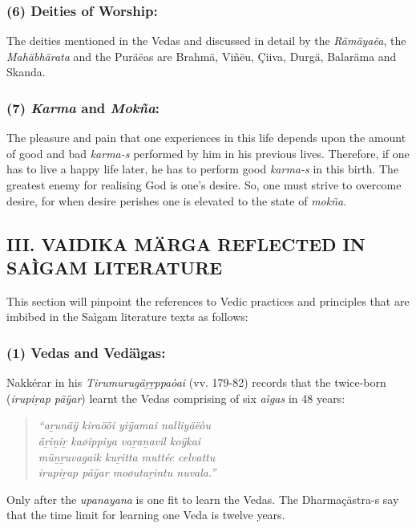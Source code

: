 \subsubsection*{(6) Deities of Worship:}

The deities mentioned in the Vedas and discussed in detail by the \textit{Rämäyaëa}, the \textit{Mahäbhärata} and the Puräëas are Brahmä, Viñëu, Çiiva, Durgä, Balaräma and Skanda.


\subsubsection*{(7) \textit{Karma} and \textit{Mokña}:}

The pleasure and pain that one experiences in this life depends upon the amount of good and bad \textit{karma-s} performed by him in his previous lives. Therefore, if one has to live a happy life later, he has to perform good \textit{karma-s} in this birth. The greatest enemy for realising God is one’s desire. So, one must strive to overcome desire, for when desire perishes one is elevated to the state of \textit{mokña}.


\subsection*{III. VAIDIKA MÄRGA REFLECTED IN SAÌGAM LITERATURE}

This section will pinpoint the references to Vedic practices and principles that are imbibed in the Saìgam literature texts as follows:

\subsubsection*{(1) Vedas and Vedäìgas:}

Nakkérar in his \textit{Tirumurugäṟṟppaòai} (vv. 179-82) records that the twice-born (\textit{irupiṟap päÿar}) learnt the Vedas comprising of six \textit{aìgas} in 48 years:

\begin{verse}
\textit{“aṟunäÿ kiraööi yiÿamai nalliyäëòu}\\\textit{äṟiṉiṟ kaøippiya vaṟaṉavil koÿkai}\\\textit{müṉṟuvagaik kuṟitta muttéc celvattu}\\\textit{irupiṟap päÿar moøutaṟintu nuvala.”}
\end{verse}

Only after the \textit{upanayana} is one fit to learn the Vedas. The Dharmaçästra-s say that the time limit for learning one Veda is twelve years.

